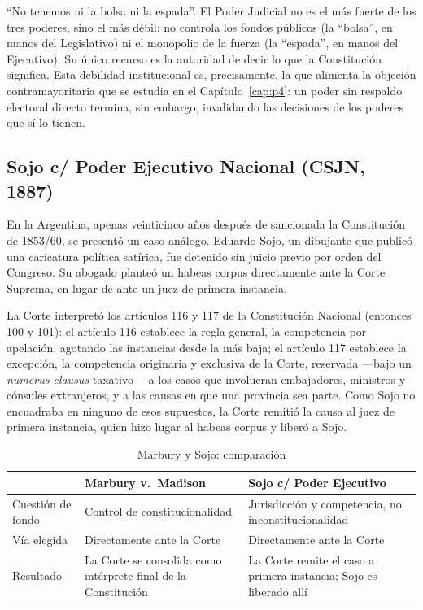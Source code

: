 \documentclass[12pt,oneside]{book}
\begin{document}
\begin{impbox}
``No tenemos ni la bolsa ni la espada''. El Poder Judicial no es el más fuerte
de los tres poderes, sino el más débil: no controla los fondos públicos (la
``bolsa'', en manos del Legislativo) ni el monopolio de la fuerza (la ``espada'',
en manos del Ejecutivo). Su único recurso es la autoridad de decir lo que la
Constitución significa. Esta debilidad institucional es, precisamente, la que
alimenta la objeción contramayoritaria que se estudia en el
Capítulo~\ref{cap:p4}: un poder sin respaldo electoral directo termina, sin
embargo, invalidando las decisiones de los poderes que sí lo tienen.
\end{impbox}

\subsection{Sojo c/ Poder Ejecutivo Nacional (CSJN, 1887)}

En la Argentina, apenas veinticinco años después de sancionada la Constitución de
1853/60, se presentó un caso análogo. Eduardo Sojo, un dibujante que publicó una
caricatura política satírica, fue detenido sin juicio previo por orden del
Congreso. Su abogado planteó un habeas corpus directamente ante la Corte Suprema,
en lugar de ante un juez de primera instancia.

La Corte interpretó los artículos 116 y 117 de la Constitución Nacional
(entonces 100 y 101): el artículo 116 establece la regla general, la competencia
por apelación, agotando las instancias desde la más baja; el artículo 117
establece la excepción, la competencia originaria y exclusiva de la Corte,
reservada —bajo un \textit{numerus clausus} taxativo— a los casos que involucran
embajadores, ministros y cónsules extranjeros, y a las causas en que una provincia
sea parte. Como Sojo no encuadraba en ninguno de esos supuestos, la Corte remitió
la causa al juez de primera instancia, quien hizo lugar al habeas corpus y liberó
a Sojo.

\begin{table}[H]
\centering
\caption{Marbury y Sojo: comparación}
\begin{tabularx}{\textwidth}{@{}lXX@{}}
\toprule
& \textbf{Marbury v.\ Madison} & \textbf{Sojo c/ Poder Ejecutivo} \\
\midrule
Cuestión de fondo & Control de constitucionalidad & Jurisdicción y competencia, no
inconstitucionalidad \\
Vía elegida & Directamente ante la Corte & Directamente ante la Corte \\
Resultado & La Corte se consolida como intérprete final de la Constitución & La
Corte remite el caso a primera instancia; Sojo es liberado allí \\
\bottomrule
\end{tabularx}
\end{table}
\end{document}
